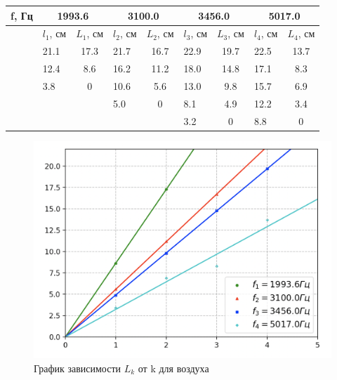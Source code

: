\documentclass[12pt,a4paper]{article}
\begin{document}
\begin{enumerate}
\begin{table}[ht!]
\begin{center}
\begin{tabular}{|c|cc|cc|cc|cc|}
\hline
f, Гц & \multicolumn{2}{c|}{1993.6}                & \multicolumn{2}{c|}{3100.0}                & \multicolumn{2}{c|}{3456.0}                & \multicolumn{2}{c|}{5017.0}                \\ \hline
      & \multicolumn{1}{l|}{$l_1$, см} & $L_1$, см & \multicolumn{1}{l|}{$l_2$, см} & $L_2$, см & \multicolumn{1}{l|}{$l_3$, см} & $L_3$, см & \multicolumn{1}{l|}{$l_4$, см} & $L_4$, см \\ \hline
      & \multicolumn{1}{l|}{21.1}      & 17.3      & \multicolumn{1}{l|}{21.7}      & 16.7      & \multicolumn{1}{l|}{22.9}      & 19.7      & \multicolumn{1}{l|}{22.5}      & 13.7      \\ \hline
      & \multicolumn{1}{l|}{12.4}      & 8.6       & \multicolumn{1}{l|}{16.2}      & 11.2      & \multicolumn{1}{l|}{18.0}      & 14.8      & \multicolumn{1}{l|}{17.1}      & 8.3       \\ \hline
      & \multicolumn{1}{l|}{3.8}       & 0         & \multicolumn{1}{l|}{10.6}      & 5.6       & \multicolumn{1}{l|}{13.0}      & 9.8       & \multicolumn{1}{l|}{15.7}      & 6.9       \\ \hline
      & \multicolumn{1}{l|}{}          &           & \multicolumn{1}{l|}{5.0}       & 0         & \multicolumn{1}{l|}{8.1}       & 4.9       & \multicolumn{1}{l|}{12.2}      & 3.4       \\ \hline
      & \multicolumn{1}{l|}{}          &           & \multicolumn{1}{l|}{}          &           & \multicolumn{1}{l|}{3.2}       & 0         & \multicolumn{1}{l|}{8.8}       & 0         \\ \hline
\end{tabular}
\end{center}
\end{table}

\begin{figure}[htp]
    \centering
    \includegraphics[width=0.5\linewidth]{air.png}
    \caption{График зависимости $L_k$ от k для воздуха}
    \label{fig:my_label}
\end{figure}


\end{enumerate}
\end{document}
